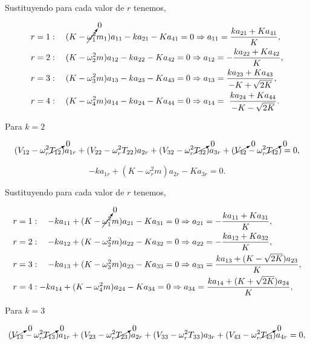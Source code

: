 \documentclass[a4paper,10pt]{article}
\numberwithin{equation}{section}
\begin{document}
Sustituyendo para cada valor de $r$ tenemos,

\begin{align*}
 r &= 1: \quad  (K - \cancelto{0}{\omega_1^2}m_1)a_{11} - ka_{21} - Ka_{41}= 0 \Rightarrow
 a_{11}= \frac{ka_{21} + Ka_{41}}{K}, \\
 r &= 2: \quad (K - \omega_2^2m)a_{12} - ka_{22} - Ka_{42} = 0 \Rightarrow
 a_{12} = - \frac{ka_{22} + Ka_{42}}{K}, \\
 r &= 3: \quad (K - \omega_3^2m)a_{13} - ka_{23} - Ka_{43} = 0 \Rightarrow
 a_{13} = \frac{ka_{23} + Ka_{43}}{-K + \sqrt{2K}}, \\
 r &= 4: \quad (K - \omega_4^2m)a_{14} - ka_{24} - Ka_{44} = 0 \Rightarrow  
 a_{14} = \ \frac{ka_{24} + Ka_{44}}{-K - \sqrt{2K}}.
 \end{align*}
 
Para $k = 2$ 

\begin{equation}
 (V_{12} - \omega_r^2 \cancelto{0}{T_{12}})a_{1r} + (V_{22} - \omega_r^2 T_{22})a_{2r} 
  + (V_{32} - \omega_r^2 \cancelto{0}{T_{32}})a_{3r} + (\cancelto{0}{V_{42}} - \omega_r^2 \cancelto{0}{T_{42}})= 0,
\end{equation}

\begin{equation}
 -ka_{1r} + (K - \omega_r^2m)a_{2r} - Ka_{3r} = 0.
\end{equation}

Sustituyendo para cada valor de $r$ tenemos,

\begin{align}
 r &= 1: \quad -ka_{11} + (K - \cancelto{0}{\omega_1^2}m)a_{21} - Ka_{31} = 0 \Rightarrow 
 a_{21} = - \frac{ka_{11} + Ka_{31}}{K}, \\
 r &= 2: \quad -ka_{12} + (K - \omega_2^2m)a_{22} - Ka_{32} = 0 \Rightarrow
 a_{22} = - \frac{ka_{12} + Ka_{32}}{K}, \\
 r &= 3: \quad -ka_{13} + (K - \omega_3^2m)a_{23} - Ka_{33} = 0 \Rightarrow
 a_{33} = \frac{ka_{13} + (K - \sqrt{2K})a_{23}}{K}, \\
 r &= 4: -ka_{14} + (K - \omega_4^2m)a_{24} - Ka_{34} = 0 \Rightarrow 
 a_{34} = \frac{ka_{14} + (K + \sqrt{2K})a_{24}}{K},
\end{align}

Para $k = 3$ 

\begin{equation}
 (\cancelto{0}{V_{13}} - \omega_r^2 \cancelto{0}{T_{13}})a_{1r} + (V_{23} - \omega_r^2 \cancelto{0}{T_{23}})a_{2r} 
  + (V_{33} - \omega_r^2 T_{33})a_{3r} + (V_{43} - \omega_r^2 \cancelto{0}{T_{43}})a_{4r} = 0,
\end{equation}
\end{document}
